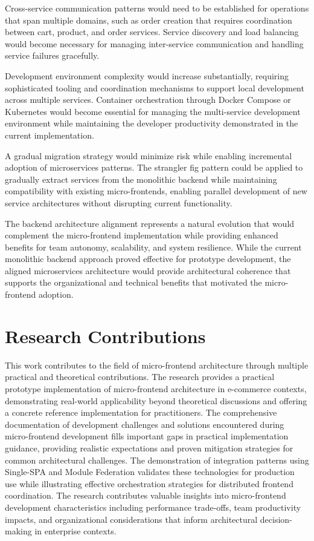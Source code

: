 \documentclass[12pt,a4paper]{report}
\begin{document}
Cross-service communication patterns would need to be established for operations that span multiple domains, such as order creation that requires coordination between cart, product, and order services. Service discovery and load balancing would become necessary for managing inter-service communication and handling service failures gracefully.

Development environment complexity would increase substantially, requiring sophisticated tooling and coordination mechanisms to support local development across multiple services. Container orchestration through Docker Compose or Kubernetes would become essential for managing the multi-service development environment while maintaining the developer productivity demonstrated in the current implementation.

A gradual migration strategy would minimize risk while enabling incremental adoption of microservices patterns. The strangler fig pattern could be applied to gradually extract services from the monolithic backend while maintaining compatibility with existing micro-frontends, enabling parallel development of new service architectures without disrupting current functionality.

The backend architecture alignment represents a natural evolution that would complement the micro-frontend implementation while providing enhanced benefits for team autonomy, scalability, and system resilience. While the current monolithic backend approach proved effective for prototype development, the aligned microservices architecture would provide architectural coherence that supports the organizational and technical benefits that motivated the micro-frontend adoption.

\section{Research Contributions}

This work contributes to the field of micro-frontend architecture through multiple practical and theoretical contributions. The research provides a practical prototype implementation of micro-frontend architecture in e-commerce contexts, demonstrating real-world applicability beyond theoretical discussions and offering a concrete reference implementation for practitioners. The comprehensive documentation of development challenges and solutions encountered during micro-frontend development fills important gaps in practical implementation guidance, providing realistic expectations and proven mitigation strategies for common architectural challenges. The demonstration of integration patterns using Single-SPA and Module Federation validates these technologies for production use while illustrating effective orchestration strategies for distributed frontend coordination. The research contributes valuable insights into micro-frontend development characteristics including performance trade-offs, team productivity impacts, and organizational considerations that inform architectural decision-making in enterprise contexts.
\end{document}
